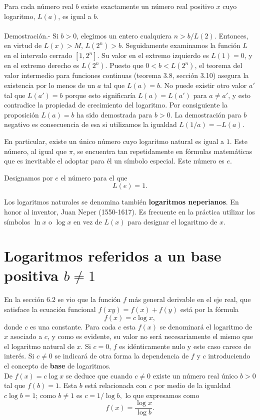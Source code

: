 \begin{teo}
    Para cada número real $b$ existe exactamente un número real positivo $x$ cuyo logaritmo, $L(a)$, es igual a $b$.\\\\
    Demostración.-\; Si $b>0$, elegimos un entero cualquiera $n>b/L(2)$. Entonces, en virtud de $L(x)>M$, $L\left(2^n\right)>b.$ Seguidamente examinamos la función $L$ en el intervalo cerrado $[1,2^n]$. Su valor en el extremo izquierdo es $L(1)=0$, y en el extremo derecho es $L(2^n)$. Puesto que $0<b<L\left(2^n\right)$, el teorema del valor intermedio para funciones continuas (teorema 3.8, sección 3.10) asegura la existencia por lo menos de un $a$ tal que $L(a)=b$. No puede existir otro valor $a'$ tal que $L\left(a'\right)=b$ porque esto significaría $L(a)=L\left(a'\right)$ para $a\neq a'$, y esto contradice la propiedad de crecimiento del logaritmo. Por consiguiente la proposición $L(a)=b$ ha sido demostrada para $b>0$. La demostración para $b$ negativo es consecuencia de esa si utilizamos la igualdad $L(1/a)=-L(a)$.
\end{teo}

En particular, existe un único número cuyo logaritmo natural es igual a $1$. Este número, al igual que $\pi$, se encuentra tan repetidamente en fórmulas matemáticas que es inevitable el adoptar para él un símbolo especial. Este número es $e$.

\begin{def.}
    Designamos por $e$ el número para el que
    $$L(e)=1.$$
\end{def.}

Los logaritmos naturales se denomina también \textbf{logaritmos neperianos}. En honor al inventor, Juan Neper (1550-1617). Es frecuente en la práctica utilizar los símbolos $\ln x$ o $\log x$ en vez de $L(x)$ para designar el logaritmo de $x$.


\section{Logaritmos referidos a un base positiva \boldmath $b\neq 1$}

En la sección 6.2 se vio que la función $f$ más general derivable en el eje real, que satisface la ecuación funcional $f(xy)=f(x)+f(y)$ está por la fórmula
$$f(x)=c\log x,$$
donde $c$ es una constante. Para cada $c$ esta $f(x)$ se denominará el logaritmo de $x$ asociado a $c$, y como es evidente, su valor no será necesariamente el mismo que el logaritmo natural de $x$. Si $c=0$, $f$ es idénticamente nulo y este caso carece de interés. Si $c\neq 0$ se indicará de otra forma la dependencia de $f$ y $c$ introduciendo el concepto de \textbf{base} de logaritmos.\\
De $f(x)=c\log x$ se deduce que cuando $c\neq 0$ existe un número real único $b>0$ tal que $f(b)=1$. Esta $b$ está relacionada con $c$ por medio de la igualdad $c\log b=1$; como $b\neq 1$ es $c=1/\log b,$ lo que expresamos como
$$f(x)=\dfrac{\log x}{\log b}.$$


